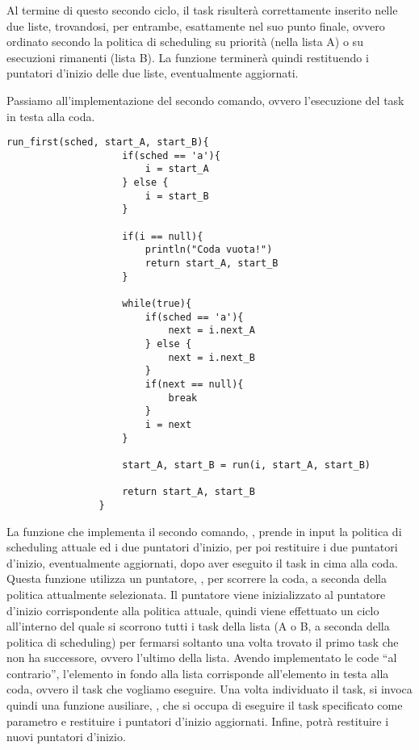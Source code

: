         Al termine di questo secondo ciclo, il task risulterà correttamente inserito nelle due liste, trovandosi, per entrambe, esattamente nel suo punto finale, ovvero ordinato secondo la politica di scheduling su priorità (nella lista A) o su esecuzioni rimanenti (lista B). La funzione  terminerà quindi restituendo i puntatori d'inizio delle due liste, eventualmente aggiornati.
        
        Passiamo all'implementazione del secondo comando, ovvero l'esecuzione del task in testa alla coda.
        
        \begin{center}
            \begin{lstlisting}[language=pseudo, gobble=14]
                run_first(sched, start_A, start_B){
                    if(sched == 'a'){
                        i = start_A
                    } else {
                        i = start_B
                    }
                    
                    if(i == null){
                        println("Coda vuota!")
                        return start_A, start_B
                    }
                    
                    while(true){
                        if(sched == 'a'){
                            next = i.next_A
                        } else {
                            next = i.next_B
                        }
                        if(next == null){
                            break
                        }
                        i = next
                    }
                    
                    start_A, start_B = run(i, start_A, start_B)
                    
                    return start_A, start_B
                }\end{lstlisting}
        \end{center}
        
        La funzione che implementa il secondo comando, , prende in input la politica di scheduling attuale ed i due puntatori d'inizio, per poi restituire i due puntatori d'inizio, eventualmente aggiornati, dopo aver eseguito il task in cima alla coda. Questa funzione utilizza un puntatore, , per scorrere la coda, a seconda della politica attualmente selezionata. Il puntatore  viene inizializzato al puntatore d'inizio corrispondente alla politica attuale, quindi viene effettuato un ciclo all'interno del quale si scorrono tutti i task della lista (A o B, a seconda della politica di scheduling) per fermarsi soltanto una volta trovato il primo task che non ha successore, ovvero l'ultimo della lista. Avendo implementato le code ``al contrario'', l'elemento in fondo alla lista corrisponde all'elemento in testa alla coda, ovvero il task che vogliamo eseguire. Una volta individuato il task, si invoca quindi una funzione ausiliare, , che si occupa di eseguire il task specificato come parametro e restituire i puntatori d'inizio aggiornati. Infine,  potrà restituire i nuovi puntatori d'inizio.
        
